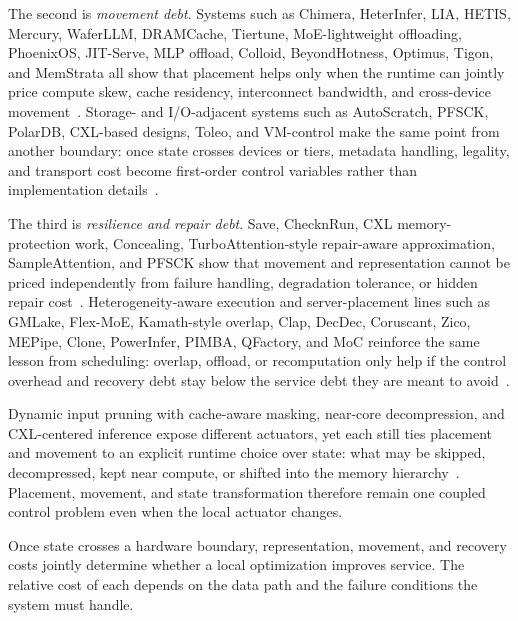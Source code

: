 The second is \emph{movement debt}. Systems such as Chimera, HeterInfer, LIA, HETIS, Mercury, WaferLLM, DRAMCache, Tiertune, MoE-lightweight offloading, PhoenixOS, JIT-Serve, MLP offload, Colloid, BeyondHotness, Optimus, Tigon, and MemStrata all show that placement helps only when the runtime can jointly price compute skew, cache residency, interconnect bandwidth, and cross-device movement~\cite{huang2025chimera,chen2025heteroinfer,kim2025lia,mo2025hetis,mercury2025rms,he2025waferllm,hong2024dramcache,lee2025tiertune,cao2025moelightning,wei2025phoenixos,zhang2026jitserve,maurya2025mlpoffload,vuppalapati2024colloid,liu2025beyondhotness,feng2025optimus,huang2025tigon,zhong2024memstrata}. Storage- and I/O-adjacent systems such as AutoScratch, PFSCK, PolarDB, CXL-based designs, Toleo, and VM-control make the same point from another boundary: once state crosses devices or tiers, metadata handling, legality, and transport cost become first-order control variables rather than implementation details~\cite{fu2024autoscratch,domingo2021pfsck,cao2020polardb,ji2025cxl,dong2024toleo,zheng2024vmcu,tabatabai2024fbmm}.

The third is \emph{resilience and repair debt}. Save, ChecknRun, CXL memory-protection work, Concealing, TurboAttention-style repair-aware approximation, SampleAttention, and PFSCK show that movement and representation cannot be priced independently from failure handling, degradation tolerance, or hidden repair cost~\cite{zheng2025save,eisenman2022checknrun,zhao2025equilibria,jin2024concealing,kang2025turboattention,zhu2024sampleattention,domingo2021pfsck}. Heterogeneity-aware execution and server-placement lines such as GMLake, Flex-MoE, Kamath-style overlap, Clap, DecDec, Coruscant, Zico, MEPipe, Clone, PowerInfer, PIMBA, QFactory, and MoC reinforce the same lesson from scheduling: overlap, offload, or recomputation only help if the control overhead and recovery debt stay below the service debt they are meant to avoid~\cite{guo2024gmlake,cao2025moelightning,kamath2025podattention,park2025clap,park2025decdec,joo2025coruscant,zico21,sun2025mepipe,tian2025clone,song2024powerinfer,kim2025pimba,zhang2025qfactory,cai2025moc}.

Dynamic input pruning with cache-aware masking, near-core decompression, and CXL-centered inference expose different actuators, yet each still ties placement and movement to an explicit runtime choice over state: what may be skipped, decompressed, kept near compute, or shifted into the memory hierarchy~\cite{federici2025dip,gerogiannis2025deca,gu2025cent}. Placement, movement, and state transformation therefore remain one coupled control problem even when the local actuator changes.

Once state crosses a hardware boundary, representation, movement, and recovery costs jointly determine whether a local optimization improves service. The relative cost of each depends on the data path and the failure conditions the system must handle.
